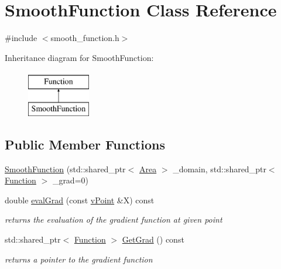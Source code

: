 \hypertarget{class_smooth_function}{}\section{Smooth\+Function Class Reference}
\label{class_smooth_function}


{\ttfamily \#include $<$smooth\+\_\+function.\+h$>$}

Inheritance diagram for Smooth\+Function\+:\begin{figure}[H]
\begin{center}
\leavevmode
\includegraphics[height=2.000000cm]{class_smooth_function}
\end{center}
\end{figure}
\subsection*{Public Member Functions}
\begin{DoxyCompactItemize}
\item 
\hyperlink{class_smooth_function_aef997deb82c58de84cefd6559faa563b}{Smooth\+Function} (std\+::shared\+\_\+ptr$<$ \hyperlink{class_area}{Area} $>$ \+\_\+domain, std\+::shared\+\_\+ptr$<$ \hyperlink{class_function}{Function} $>$ \+\_\+grad=0)
\item 
\mbox{\label{class_smooth_function_a0248faaf91e0e718103573574c83a517}} 
double \hyperlink{class_smooth_function_a0248faaf91e0e718103573574c83a517}{eval\+Grad} (const \hyperlink{classv_point}{v\+Point} \&X) const
\begin{DoxyCompactList}\small\item\em returns the evaluation of the gradient function at given point \end{DoxyCompactList}\item 
\mbox{\label{class_smooth_function_ac71c6ad9eeb1baf639d8fc6db333033c}} 
std\+::shared\+\_\+ptr$<$ \hyperlink{class_function}{Function} $>$ \hyperlink{class_smooth_function_ac71c6ad9eeb1baf639d8fc6db333033c}{Get\+Grad} () const
\begin{DoxyCompactList}\small\item\em returns a pointer to the gradient function \end{DoxyCompactList}\end{DoxyCompactItemize}
